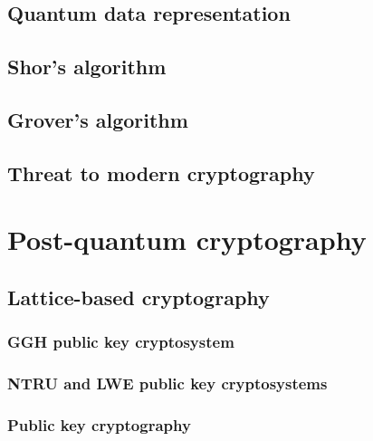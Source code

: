 \section{Quantum data representation}
\label{sec:quantum_data_repr}


\section{Shor's algorithm}
\label{sec:shors_algorithm}


\section{Grover's algorithm}
\label{sec:grovers_alg}


\section{Threat to modern cryptography}
\label{sec:threat_to_modern}


\chapter{Post-quantum cryptography}
\label{ch:pq_crypto}


\section{Lattice-based cryptography}
\label{sec:lattice_based_crypto}


\subsection{GGH public key cryptosystem}
\label{sec:ggh}


\subsection{NTRU and LWE public key cryptosystems}
\label{sec:ntru_lwe}


\subsection{Public key cryptography}
\label{sec:lattice_pub_key}


